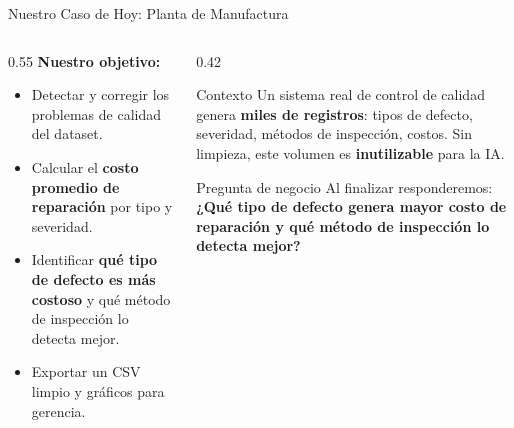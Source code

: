 \documentclass[aspectratio=169]{beamer}
\begin{document}
\begin{frame}{Nuestro Caso de Hoy: Planta de Manufactura}
\begin{columns}[T]
\begin{column}{0.55\textwidth}
      \vspace{0.12cm}
      \textbf{Nuestro objetivo:}
      \begin{itemize}\setlength\itemsep{2pt}
        \item Detectar y corregir los problemas de calidad del dataset.
        \item Calcular el \textbf{costo promedio de reparación} por tipo y severidad.
        \item Identificar \textbf{qué tipo de defecto es más costoso} y qué método de inspección lo detecta mejor.
        \item Exportar un CSV limpio y gráficos para gerencia.
      \end{itemize}
    \end{column}
    \begin{column}{0.42\textwidth}
      \begin{alertblock}{\faIndustry\enspace Contexto}
        \small
        Un sistema real de control de calidad genera \textbf{miles de registros}: tipos de defecto, severidad, métodos de inspección, costos. Sin limpieza, este volumen es \textbf{inutilizable} para la IA.
      \end{alertblock}
      \vspace{0.15cm}
      \begin{conceptbox}{\faLightbulb\enspace Pregunta de negocio}
        \small
        Al finalizar responderemos:\\[4pt]
        \textbf{¿Qué tipo de defecto genera mayor costo de reparación y qué método de inspección lo detecta mejor?}
      \end{conceptbox}
    \end{column}
  \end{columns}
\end{frame}
\end{document}
